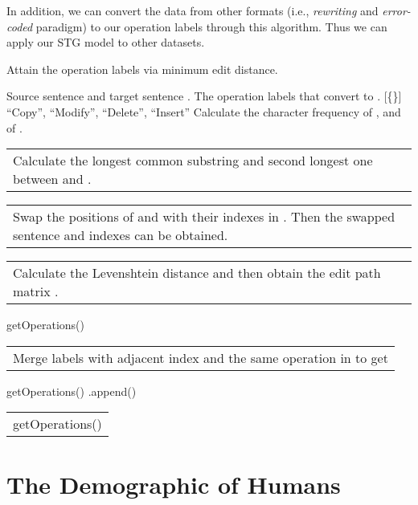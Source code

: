 \documentclass[11pt]{article}
\begin{document}
In addition, we can convert the data from other formats (i.e., \emph{rewriting} and \emph{error-coded} paradigm) to our operation labels through this algorithm. Thus we can apply our STG model to other datasets.

\makeatletter
\newcommand{\multiline}[1]{\begin{tabularx}{\dimexpr\linewidth-\ALG@thistlm}[t]{@{}X@{}}
    #1
  \end{tabularx}
}
\makeatother

\begin{algorithm}[ht]
    \small
    \caption{Attain the operation labels via minimum edit distance.}
    \begin{algorithmic}[1]
            Source sentence  and target sentence .
            The operation labels  that convert  to .
             [\{\}]
        \EndIf
        \State 
        \State ``Copy'', ``Modify'', ``Delete'', ``Insert''
        \State 
        \State Calculate the character frequency  of , and  of .
        \If{}
            \State \multiline{Calculate the longest common substring  and second longest one  between  and .} 
            \State \multiline{
            Swap the positions of  and  with their indexes  in . Then the swapped sentence  and indexes  can be obtained.}
            \If{}
                \State 
            \Else 
            \EndIf
        \Else
            \State \multiline{
            Calculate the Levenshtein distance and then obtain the edit path matrix .}
\State 
            \State getOperations()
            \State \multiline{Merge labels with adjacent index and the same operation in  to get }
        \EndIf
        
        \;
        
         getOperations()
            \If{}
            \EndIf
                \If{}
                    \State .append()
                    \State \multiline{
                    getOperations()}
                \EndIf
            \EndFor
    \end{algorithmic}    
    \label{algo:minimal}
\end{algorithm}
  

\section{The Demographic of Humans}
\label{appendix:demographic}
\end{document}
